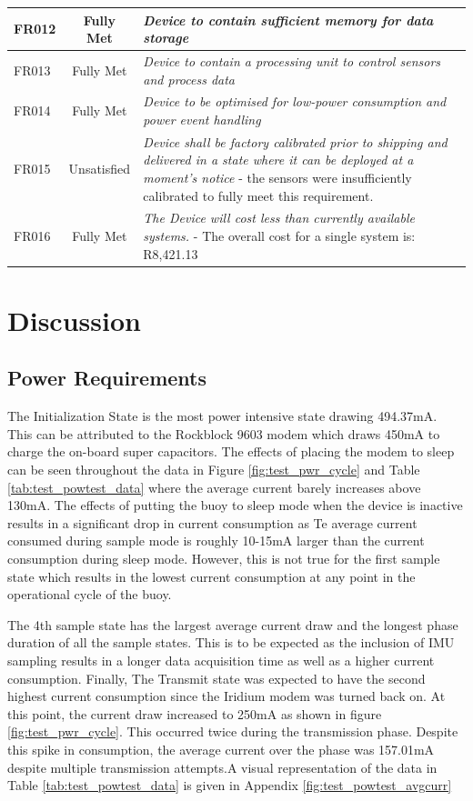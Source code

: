 \begin{table}[H]
\begin{tabular}{|m{}|c| m{}|}
     FR012 & Fully Met & \textit{Device to contain sufficient memory for data storage}\\
          \hline
     FR013 & Fully Met &\textit{ Device to contain a processing unit to control sensors and process data}\\     
     \hline
     FR014 & Fully Met & \textit{ Device to be optimised for low-power consumption and power event handling}\\
          \hline
     FR015 & Unsatisfied & \textit{Device shall be factory calibrated prior to shipping and delivered in a state where it can be deployed at a moment's notice} - the sensors were insufficiently calibrated to fully meet this requirement.\\
          \hline
    FR016 & Fully Met & \textit{The Device will cost less than currently available systems.} - The overall cost for a single system is: R8,421.13 \\
    \hline
    \end{tabular}

    \label{tab:final_eval_funcreq}
\end{table}

\section{Discussion}
\label{sec:ch4_disc}

\subsection{Power Requirements}
\label{subsection:PWR}
The Initialization State is the most power intensive state drawing 494.37mA. This can be attributed to the Rockblock 9603 modem which draws 450mA to charge the on-board super capacitors. The effects of placing the modem to sleep can be seen throughout the data in Figure \ref{fig:test_pwr_cycle} and Table \ref{tab:test_powtest_data} where the average current barely increases above 130mA. The effects of putting the buoy to sleep mode when the device is inactive results in a significant drop in current consumption as Te average current consumed during sample mode is roughly 10-15mA larger than the current consumption during sleep mode. However, this is not true for the first sample state which results in the lowest current consumption at any point in the operational cycle of the buoy.\par The 4th sample state has the largest average current draw and the longest phase duration of all the sample states. This is to be expected as the inclusion of IMU sampling results in a longer data acquisition time as well as a higher current consumption. Finally, The Transmit state was expected to have the second highest current consumption since the Iridium modem was turned back on. At this point, the current draw increased to 250mA as shown in figure \ref{fig:test_pwr_cycle}. This occurred twice during the transmission phase. Despite this spike in consumption, the average current over the phase was 157.01mA despite multiple transmission attempts.A visual representation of the data in Table \ref{tab:test_powtest_data} is given in Appendix \ref{fig:test_powtest_avgcurr}

